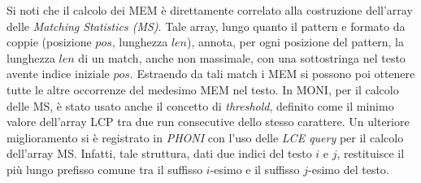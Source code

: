 \documentclass[a4paper,11pt, oneside,italian]{article}
\begin{document}
Si noti che il calcolo dei MEM è direttamente
correlato alla costruzione dell'array delle \textit{Matching Statistics (MS)}.
Tale array, lungo quanto il pattern e formato da coppie (posizione $pos$,
lunghezza $len$), annota, per ogni posizione del pattern, la lunghezza $len$ di
un match, anche non massimale, con una sottostringa nel testo avente
indice iniziale $pos$. Estraendo da tali match i MEM si possono poi ottenere
tutte le altre occorrenze del medesimo MEM nel testo. 
In MONI, per il calcolo delle MS, è stato
usato anche il concetto di \textit{threshold}, definito come
il minimo valore dell'array LCP tra due run consecutive dello stesso
carattere. Un ulteriore miglioramento si è registrato in \textit{PHONI} con
l'uso delle \textit{LCE query} per il calcolo dell'array MS. Infatti, tale
struttura, dati due indici del testo $i$ e $j$, restituisce il più lungo
prefisso comune tra il suffisso $i$-esimo e il suffisso $j$-esimo del testo.


\end{document}
